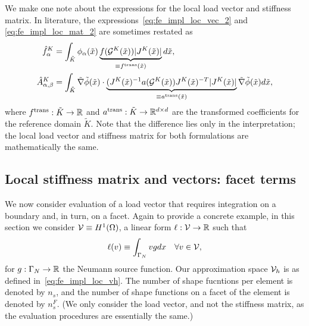We make one note about the expressions for the local load vector and stiffness matrix.  In literature, the expressions~\eqref{eq:fe_impl_loc_vec_2} and \eqref{eq:fe_impl_loc_mat_2} are sometimes restated as
\begin{align*}
  \hat f^K_\alpha
  &=
  \int_{\tilde K} \phi_\alpha(\tilde x) \underbrace{ f(\mathcal{G}^K(\tilde x)) |J^K(\tilde x)| }_{\equiv f^{\rm trans}(\tilde x)}d \tilde x, \\
  \hat A^K_{\alpha,\beta}
  &=
  \int_{\tilde K} \tilde \nabla \tilde \phi(\tilde x)
  \cdot  \underbrace{ (J^K(\tilde x)^{-1} a(\mathcal{G}^K(\tilde x)) J^K(\tilde x)^{-T} |J^K(\tilde x)| }_{\equiv  a^{\rm trans}(\tilde x)}\tilde \nabla \tilde \phi(\tilde x)  d\tilde x,
\end{align*}
where $f^{\rm trans}: \tilde K \to \mathbb{R}$  and $a^{\rm trans}:\tilde K \to \mathbb{R}^{d \times d}$ are the transformed coefficients for the reference domain $\tilde K$. Note that the difference lies only in the interpretation; the local load vector and stiffness matrix for both formulations are mathematically the same.

\subsection{Local stiffness matrix and vectors: facet terms}
We now consider evaluation of a load vector that requires integration on a boundary and, in turn, on a facet.  Again to provide a concrete example, in this section we consider $\mathcal{V} \equiv H^1(\Omega)$, a linear form $\ell: \mathcal{V} \to \mathbb{R}$ such that
\begin{equation}
  \ell(v) \equiv \int_{\Gamma_N} v g dx \quad \forall v \in \mathcal{V},
  \label{eq:fe_impl_model_g}
\end{equation}
for $g: \Gamma_N \to \mathbb{R}$ the Neumann source function. Our approximation space $\mathcal{V}_h$ is as defined in~\eqref{eq:fe_impl_loc_vh}.  The number of shape fucntions per element is denoted by $n_s$, and the number of shape functions on a facet of the element is denoted by $n_s^F$.  (We only consider the load vector, and not the stiffness matrix, as the evaluation procedures are essentially the same.)

